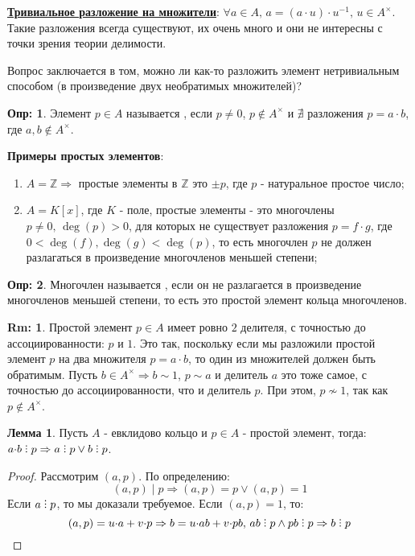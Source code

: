 \documentclass[12pt]{article}
\newcommand{\MZ}{\mathbb{Z}}
\theoremstyle{definition}
\newtheorem{defn}{Опр:}
\newtheorem{rem}{Rm:}
\newtheorem{lemma}{Лемма}
\DeclareRobustCommand{\divby}{%
	\mathrel{\text{\vbox{\baselineskip.65ex\lineskiplimit0pt\hbox{.}\hbox{.}\hbox{.}}}}%
}
\begin{document}
\textbf{\uline{Тривиальное разложение на множители}}: $\forall a \in A, \, a = (a{\cdot}u){\cdot}u^{-1}, \, u \in A^{\times}$. Такие разложения всегда существуют, их очень много и они не интересны с точки зрения теории делимости. 

Вопрос заключается в том, можно ли как-то разложить элемент нетривиальным способом (в произведение двух необратимых множителей)?

\begin{defn}
	Элемент $p \in A$ называется , если $p \neq 0$, $p \not\in A^{\times}$ и $\nexists$ разложения $p = a{\cdot}b$, где $a,b \not\in A^{\times}$.
\end{defn}

\textbf{Примеры простых элементов}:
\begin{enumerate}[label=\arabic*)]
	\item $A = \MZ \Rightarrow$ простые элементы в $\MZ$ это $\pm p$, где $p$ - натуральное простое число;
	\item $A = K[x]$, где $K$ - поле, простые элементы - это многочлены $p \neq 0, \, \deg(p) > 0$, для которых не существует разложения $p = f{\cdot}g$, где $0 < \deg(f), \deg(g) < \deg(p)$, то есть многочлен $p$ не должен разлагаться в произведение многочленов меньшей степени;
\end{enumerate}
\begin{defn}
	Многочлен называется , если он не разлагается в произведение многочленов меньшей степени, то есть это простой элемент кольца многочленов.
\end{defn}
\begin{rem}
	Простой элемент $p \in A$ имеет ровно $2$ делителя, с точностью до ассоциированности: $p$ и $1$. Это так, поскольку если мы разложили простой элемент $p$ на два множителя $p = a{\cdot}b$, то один из множителей должен быть обратимым. Пусть $b \in A^{\times}\Rightarrow b \sim 1$, $p \sim a$ и делитель $a$ это тоже самое, с точностью до ассоциированности, что и делитель $p$. При этом, $p \not\sim 1$, так как $p \not\in A^{\times}$.
\end{rem}
\begin{lemma}
	Пусть $A$ - евклидово кольцо и $p \in A$ - простой элемент, тогда: $a{\cdot}b \divby p \Rightarrow a\divby p \vee b \divby p$.
\end{lemma}
\begin{proof}
	Рассмотрим $(a,p)$. По определению: 
	$$
		(a,p)\mid p \Rightarrow (a,p) = p \vee (a,p) = 1
	$$ 
	Если $a \divby p$, то мы доказали требуемое. Если $(a,p) = 1$, то: 
	$$
		(a,p) = u{\cdot}a + v{\cdot}p \Rightarrow b = u{\cdot}ab + v{\cdot}pb, \, ab \divby p \wedge pb \divby p \Rightarrow b \divby p
	$$
\end{proof}
\end{document}
